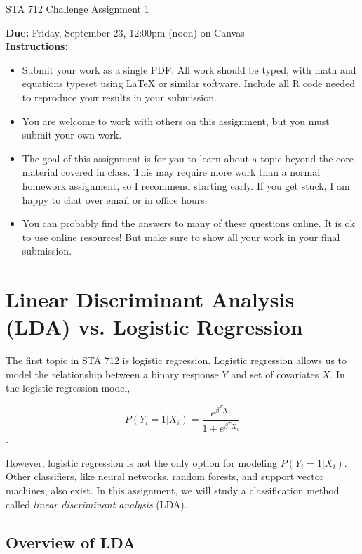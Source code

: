\documentclass[11pt]{article}
\begin{document}
\begin{center}
\Large
STA 712 Challenge Assignment 1\\
\normalsize
\vspace{5mm}
\end{center}

\noindent \textbf{Due:} Friday, September 23, 12:00pm (noon) on Canvas\\ 

\noindent \textbf{Instructions:} 
\begin{itemize}
\item Submit your work as a single PDF. All work should be typed, with math and equations typeset using LaTeX or similar software. Include all R code needed to reproduce your results in your submission.
\item You are welcome to work with others on this assignment, but you must submit your own work.
\item The goal of this assignment is for you to learn about a topic beyond the core material covered in class. This may require more work than a normal homework assignment, so I recommend starting early. If you get stuck, I am happy to chat over email or in office hours.
\item You can probably find the answers to many of these questions online. It is ok to use online resources! But make sure to show all your work in your final submission.
\end{itemize}

\section*{Linear Discriminant Analysis (LDA) vs. Logistic Regression}

The first topic in STA 712 is logistic regression. Logistic regression allows us to model the relationship between a binary response $Y$ and set of covariates $X$. In the logistic regression model,

$$P(Y_i = 1 | X_i) = \dfrac{e^{\beta^T X_i}}{1 + e^{\beta^T X_i}}$$.

\noindent However, logistic regression is not the only option for modeling $P(Y_i = 1 | X_i)$. Other classifiers, like neural networks, random forests, and support vector machines, also exist. In this assignment, we will study a classification method called \textit{linear discriminant analysis} (LDA).

\subsection*{Overview of LDA}
\end{document}
